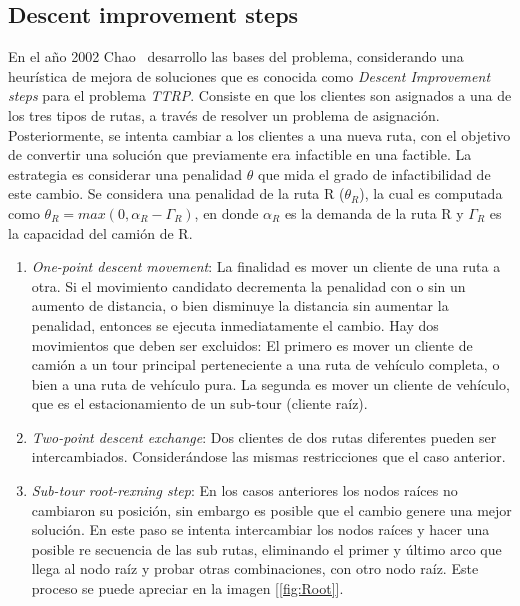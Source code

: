 \documentclass[letter, 10pt]{article}
\begin{document}
\subsection{Descent improvement steps}
     En el año 2002 Chao~\cite{Chao} desarrollo las bases del problema, considerando una heurística de mejora de soluciones que es conocida como \textit{Descent Improvement steps} para el problema \textit{TTRP}. Consiste en que los clientes son asignados a una de los tres tipos de rutas, a través de resolver un problema de asignación. Posteriormente, se intenta cambiar a los clientes a una nueva ruta, con el objetivo de convertir una solución que previamente era infactible en una factible. La estrategia es considerar una penalidad $\theta$ que mida el grado de infactibilidad de este cambio. Se considera una penalidad de la ruta R ($\theta_{R}$), la cual es computada como $\theta_{R} = max(0, \alpha_{R}-\Gamma_{R})$, en donde $\alpha_{R}$ es la demanda de la ruta R y $\Gamma_{R}$ es la capacidad del camión de R.
        \\
        \begin{enumerate}
            \item\textit{One-point descent movement}: La finalidad es mover un cliente de una ruta a otra. Si el movimiento candidato decrementa la penalidad con o sin un aumento de distancia, o bien disminuye la distancia sin aumentar la penalidad, entonces se ejecuta inmediatamente el cambio. Hay dos movimientos que deben ser excluidos: El primero es mover un cliente de camión a un tour principal perteneciente a una ruta de vehículo completa, o bien a una ruta de vehículo pura. La segunda es mover un cliente de vehículo, que es el estacionamiento de un sub-tour (cliente raíz). 
            \\
            \item\textit{Two-point descent exchange}: Dos clientes de dos rutas diferentes pueden ser intercambiados. Considerándose las mismas restricciones que el caso anterior.
            \\
            \item\textit{ Sub-tour root-rexning step}: En los casos anteriores los nodos raíces no cambiaron su posición, sin embargo es posible que el cambio genere una mejor solución. En este paso se intenta intercambiar los nodos raíces y hacer una posible re secuencia de las sub rutas, eliminando el primer y último arco que llega al nodo raíz y probar otras combinaciones, con otro nodo raíz. Este proceso se puede apreciar en la imagen [\ref{fig:Root}].
        \end{enumerate}
        
\end{document}
